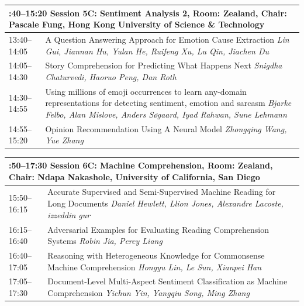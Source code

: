 \documentclass{book}
\renewcommand{\large}{\fontsize{36}{40}\selectfont}
\begin{document}
\begin{tabular}{p{3in}p{16in}}
  \multicolumn{2}{p{\textwidth}}{\bfseries\large 13:40--15:20 Session 5C: Sentiment Analysis 2, Room:  Zealand, Chair:  Pascale Fung, Hong Kong University of Science \& Technology} \\\hline

    
    13:40--14:05
    &	A Question Answering Approach for Emotion Cause Extraction \newline 
    {\itshape Lin Gui, Jiannan Hu, Yulan He, Ruifeng Xu, Lu Qin, Jiachen Du} \\
    
    14:05--14:30
    &	Story Comprehension for Predicting What Happens Next \newline 
    {\itshape Snigdha Chaturvedi, Haoruo Peng, Dan Roth} \\
    
    14:30--14:55
    &	Using millions of emoji occurrences to learn any-domain representations for detecting sentiment, emotion and sarcasm \newline 
    {\itshape Bjarke Felbo, Alan Mislove, Anders Søgaard, Iyad Rahwan, Sune Lehmann} \\
    
    14:55--15:20
    &	Opinion Recommendation Using A Neural Model \newline 
    {\itshape Zhongqing Wang, Yue Zhang} \\
    
\end{tabular}

\begin{tabular}{p{3in}p{16in}}
  \multicolumn{2}{p{\textwidth}}{\bfseries\large 15:50--17:30 Session 6C: Machine Comprehension, Room:  Zealand, Chair:  Ndapa Nakashole, University of California, San Diego} \\\hline

    
    15:50--16:15
    &	Accurate Supervised and Semi-Supervised Machine Reading for Long Documents \newline 
    {\itshape Daniel Hewlett, Llion Jones, Alexandre Lacoste, izzeddin gur} \\
    
    16:15--16:40
    &	Adversarial Examples for Evaluating Reading Comprehension Systems \newline 
    {\itshape Robin Jia, Percy Liang} \\
    
    16:40--17:05
    &	Reasoning with Heterogeneous Knowledge for Commonsense Machine Comprehension \newline 
    {\itshape Hongyu Lin, Le Sun, Xianpei Han} \\
    
    17:05--17:30
    &	Document-Level Multi-Aspect Sentiment Classification as Machine Comprehension \newline 
    {\itshape Yichun Yin, Yangqiu Song, Ming Zhang} \\
    
\end{tabular}
\end{document}
